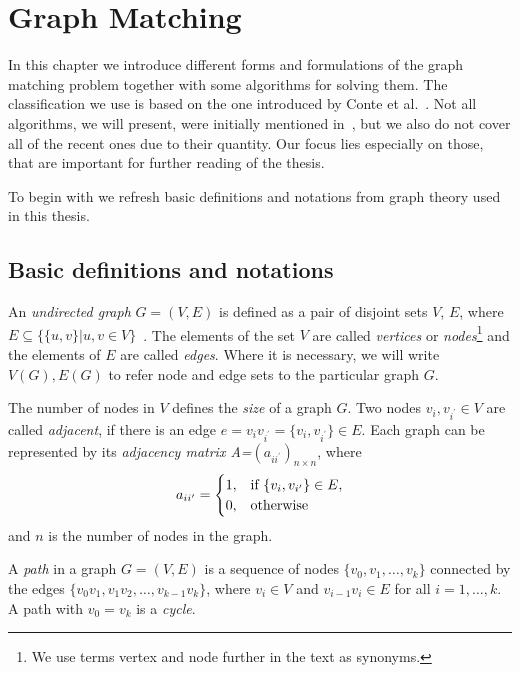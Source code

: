 
\chapter{Graph Matching} \label{chapter:GM}
In this chapter we introduce different forms and formulations of the graph matching problem together with some algorithms for solving them.
The classification we use is based on the one introduced by Conte et al.~\cite{Conte2004}. Not all algorithms, we will present, were initially mentioned in~\cite{Conte2004}, but we also do not cover all of the recent ones due to their quantity. Our focus lies especially on those, that are important for further reading of the thesis.

To begin with we refresh basic definitions and notations from graph theory used in this thesis.
\section{Basic definitions and notations}
An \emph{undirected graph} $G=(V,E)$ is defined as a pair of disjoint sets $V$, $E$, where $E\subseteq\{\{u,v\}| u, v\in V\}$~\cite{Diestel2000}. The elements of the set $V$ are called \emph{vertices} or \emph{nodes}\footnote{We use terms vertex and node further in the text as synonyms.} and the elements of $E$ are called \emph{edges}. Where it is necessary, we will write $V(G), E(G)$ to refer node and edge sets to the particular graph $G$.

The number of nodes in $V$ defines the \emph{size} of a graph $G$.
Two nodes $v_{i},v_{i^\prime}\in V$ are called \emph{adjacent}, if there is an edge $e=v_{i}v_{i^\prime}=\{v_{i},v_{i^\prime}\}\in E$. Each graph can be represented by its \emph{adjacency matrix A=$(a_{ii^\prime})_{n\times n}$}, where 
\begin{equation*}\centering
a_{ii^\prime}=\begin{cases}
 1, & \text{if } \{v_{i},v_{i^\prime}\}\in E, \\
 0, & \text{otherwise} \\
\end{cases}
\end{equation*}
and $n$ is the number of nodes in the graph.

A \emph{path} in a graph $G=(V,E)$ is a sequence of nodes $\{v_0,v_1,\dots,v_k\}$ connected by the edges $\{v_0v_1,v_1v_2,\dots,v_{k-1}v_k\}$, where $v_i\in V$ and $v_{i-1}v_i\in E$ for all $i=1,\dots,k$. A path with $v_0=v_k$ is a \emph{cycle}.

